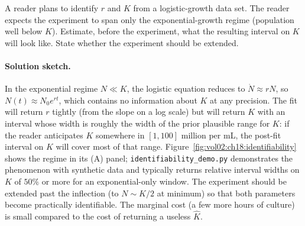 \begin{exercise}
A reader plans to identify $r$ and $K$ from a logistic-growth
data set. The reader expects the experiment to span only the
exponential-growth regime (population well below $K$).
Estimate, before the experiment, what the resulting interval on
$K$ will look like. State whether the experiment should be
extended.

\paragraph{Solution sketch.} In the exponential regime $N \ll K$,
the logistic equation reduces to $\dot N \approx rN$, so
$N(t) \approx N_{0} e^{rt}$, which contains no information about
$K$ at any precision. The fit will return $r$ tightly (from the
slope on a log scale) but will return $K$ with an interval whose
width is roughly the width of the prior plausible range for
$K$: if the reader anticipates $K$ somewhere in $[1, 100]$ million
per mL, the post-fit interval on $K$ will cover most of that range.
Figure~\ref{fig:vol02:ch18:identifiability} shows the regime in
its (A) panel; \texttt{identifiability\_demo.py} demonstrates the
phenomenon with synthetic data and typically returns relative
interval widths on $K$ of $50\%$ or more for an exponential-only
window. The experiment should be extended past the inflection (to
$N \sim K/2$ at minimum) so that both parameters become practically
identifiable. The marginal cost (a few more hours of culture) is
small compared to the cost of returning a useless $\hat K$.
\end{exercise}

